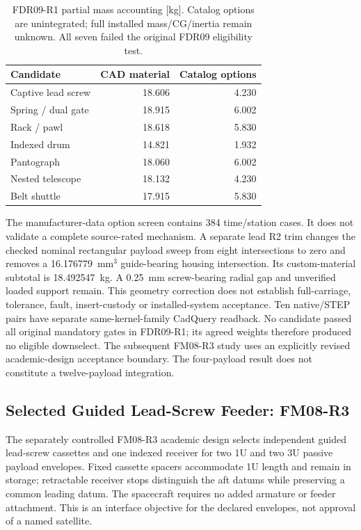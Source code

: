 \documentclass[conference]{IEEEtran}
\begin{document}
\begin{table}[t]
\centering
\caption{FDR09-R1 partial mass accounting [kg]. Catalog options are unintegrated; full installed mass/CG/inertia remain unknown. All seven failed the original FDR09 eligibility test.}
\label{tab:fdr09}
\begin{tabular}{lrr}
\toprule
Candidate & CAD material & Catalog options\\
\midrule
Captive lead screw & 18.606 & 4.230\\
Spring / dual gate & 18.915 & 6.002\\
Rack / pawl & 18.618 & 5.830\\
Indexed drum & 14.821 & 1.932\\
Pantograph & 18.060 & 6.002\\
Nested telescope & 18.132 & 4.230\\
Belt shuttle & 17.915 & 5.830\\
\bottomrule
\end{tabular}
\end{table}
The manufacturer-data option screen contains 384 time/station cases. It does not validate a complete source-rated mechanism. A separate lead R2 trim changes the checked nominal rectangular payload sweep from eight intersections to zero and removes a 16.176779~mm$^3$ guide-bearing housing intersection. Its custom-material subtotal is 18.492547~kg. A 0.25~mm screw-bearing radial gap and unverified loaded support remain. This geometry correction does not establish full-carriage, tolerance, fault, insert-custody or installed-system acceptance. Ten native/STEP pairs have separate same-kernel-family CadQuery readback. No candidate passed all original mandatory gates in FDR09-R1; its agreed weights therefore produced no eligible downselect. The subsequent FM08-R3 study uses an explicitly revised academic-design acceptance boundary. The four-payload result does not constitute a twelve-payload integration.

\subsection{Selected Guided Lead-Screw Feeder: FM08-R3}
\label{sec:selected_feeder}
The separately controlled FM08-R3 academic design selects independent guided lead-screw cassettes and one indexed receiver for two 1U and two 3U passive payload envelopes. Fixed cassette spacers accommodate 1U length and remain in storage; retractable receiver stops distinguish the aft datums while preserving a common leading datum. The spacecraft requires no added armature or feeder attachment. This is an interface objective for the declared envelopes, not approval of a named satellite.
\end{document}
